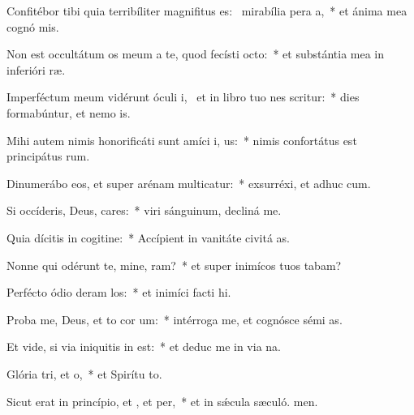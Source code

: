 \item Confitébor tibi quia terribíliter magnifitus es:~\pscross{} mirabília pera a,~* et ánima mea cognó mis.
\item Non est occultátum os meum a te, quod fecísti  octo:~* et substántia mea in inferióri ræ.
\item Imperféctum meum vidérunt óculi i,~\pscross{} et in libro tuo nes scritur:~* dies formabúntur, et nemo  is.
\item Mihi autem nimis honorificáti sunt amíci i, us:~* nimis confortátus est principátus rum.
\item Dinumerábo eos, et super arénam multicatur:~* exsurréxi, et adhuc  cum.
\item Si occíderis, Deus, cares:~* viri sánguinum, decliná  me.
\item Quia dícitis in cogitine:~* Accípient in vanitáte civitá as.
\item Nonne qui odérunt te, mine, ram?~* et super inimícos tuos tabam?
\item Perfécto ódio deram los:~* et inimíci facti  hi.
\item Proba me, Deus, et to cor um:~* intérroga me, et cognósce sémi as.
\item Et vide, si via iniquitis in  est:~* et deduc me in via na.
\item Glória tri, et o,~* et Spirítu to.
\item Sicut erat in princípio, et , et per,~* et in sǽcula sæculó. men.
